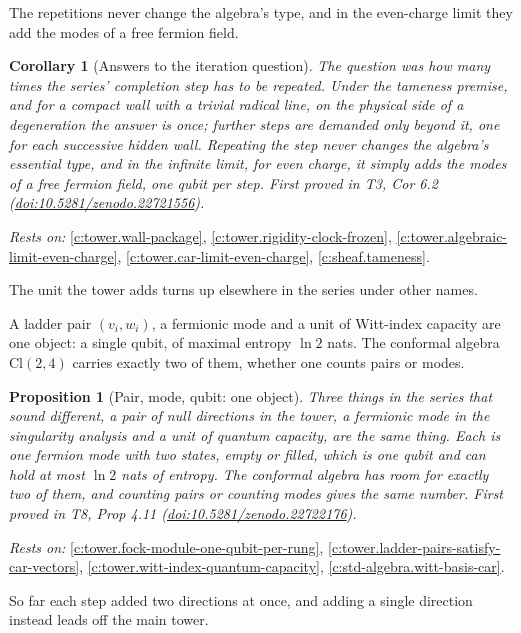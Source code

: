 \documentclass[11pt]{article}
\newtheorem{proposition}[theorem]{Proposition}
\newtheorem{corollary}[theorem]{Corollary}
\theoremstyle{definition}
\theoremstyle{plain}
\providecommand{\Cl}{}\renewcommand{\Cl}{\mathrm{Cl}}
\begin{document}
The repetitions never change the algebra's type, and in the even-charge limit they add the modes of a free fermion field.

\begin{corollary}[Answers to the iteration question]\label{c:tower.answers-iteration-question}
The question was how many times the series' completion step has to be repeated. Under the tameness premise, and for a compact wall with a trivial radical line, on the physical side of a degeneration the answer is once; further steps are demanded only beyond it, one for each successive hidden wall. Repeating the step never changes the algebra's essential type, and in the infinite limit, for even charge, it simply adds the modes of a free fermion field, one qubit per step.
\emph{First proved in} T3, Cor 6.2 (\href{https://doi.org/10.5281/zenodo.22721556}{doi:10.5281/zenodo.22721556}).
\end{corollary}
\noindent\emph{Rests on:} \ref{c:tower.wall-package}, \ref{c:tower.rigidity-clock-frozen}, \ref{c:tower.algebraic-limit-even-charge}, \ref{c:tower.car-limit-even-charge}, \ref{c:sheaf.tameness}.

The unit the tower adds turns up elsewhere in the series under other names.

A ladder pair $(v_i, w_i)$, a fermionic mode and a unit of Witt-index capacity are one object: a single qubit, of maximal entropy $\ln 2$ nats. The conformal algebra $\Cl(2,4)$ carries exactly two of them, whether one counts pairs or modes.

\begin{proposition}[Pair, mode, qubit: one object]\label{c:scrambling.pair-mode-qubit-one-object}
Three things in the series that sound different, a pair of null directions in the tower, a fermionic mode in the singularity analysis and a unit of quantum capacity, are the same thing. Each is one fermion mode with two states, empty or filled, which is one qubit and can hold at most $\ln 2$ nats of entropy. The conformal algebra has room for exactly two of them, and counting pairs or counting modes gives the same number.
\emph{First proved in} T8, Prop 4.11 (\href{https://doi.org/10.5281/zenodo.22722176}{doi:10.5281/zenodo.22722176}).
\end{proposition}
\noindent\emph{Rests on:} \ref{c:tower.fock-module-one-qubit-per-rung}, \ref{c:tower.ladder-pairs-satisfy-car-vectors}, \ref{c:tower.witt-index-quantum-capacity}, \ref{c:std-algebra.witt-basis-car}.

So far each step added two directions at once, and adding a single direction instead leads off the main tower.
\end{document}
